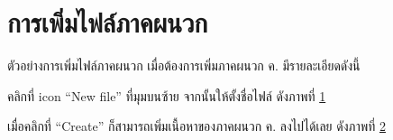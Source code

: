 \section{การเพิ่มไฟล์ภาคผนวก}
\hspace*{1.5em}
ตัวอย่างการเพิ่มไฟล์ภาคผนวก เมื่อต้องการเพิ่มภาคผนวก ค. มีรายละเอียดดังนี้
\vspace{0.5em}

\begin{mycustomenum2}
    \item คลิกที่ icon \enquote{New file} ที่มุมบนซ้าย จากนั้นให้ตั้งชื่อไฟล์ ดังภาพที่  \ref{figB:CreateFile1}

\begin{figure}[htbp]
\centering
{}
\caption{}
\label{figB:CreateFile1}
\end{figure}

    \item เมื่อคลิกที่ \enquote{Create} ก็สามารถเพิ่มเนื้อหาของภาคผนวก ค. ลงไปได้เลย ดังภาพที่ \ref{figB:CreateFile2}

\begin{figure}[htbp]
\centering
{}
\caption{}
\label{figB:CreateFile2}
\end{figure}


\end{mycustomenum2}
